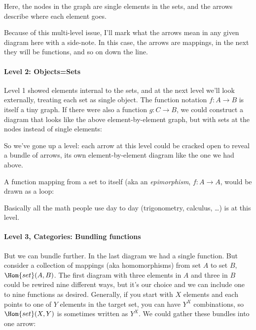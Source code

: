 \documentclass[11pt]{article}
\begin{document}
Here, the nodes in the graph are single elements in the sets, and the arrows describe
where each element goes.

Because of this multi-level issue, I'll mark what the arrows mean in any given diagram
here with a side-note. In this case, the arrows are mappings, in the next they will be
functions, and so on down the line.

\paragraph{Level 2: Objects=Sets}
Level 1 showed elements internal to the sets, and at the next level we'll look externally,
treating each set as single object.
The function notation $f:A\to B$ is itself a tiny graph. If there were also a function
$g:C\to B$, we could construct a diagram that looks like the above element-by-element
graph, but with sets at the nodes instead of single elements:

So we've gone up a level: each arrow at this level could be cracked open to reveal
a bundle of arrows, its own element-by-element diagram like the one we had above.

A function mapping from a set to itself (aka an {\em epimorphism}, $f:A\to A$, would be drawn as a loop:


Basically all the math people use day to day (trigonometry, calculus, \dots) is at this level.

\paragraph{Level 3, Categories: Bundling functions} \label{homsetsec}
But we can bundle further. In the last
diagram we had a single function. But consider a collection of mappings (aka homomorphisms)
from set $A$ to set $B$, $\Hom{set}(A, B)$.
The first diagram with three elements in $A$ and
three in $B$ could be rewired nine different ways, but it's our choice and we can include
one to nine functions as desired. Generally, if you start with $X$ elements and each
points to one of $Y$ elements in the target set, you can have $Y^X$ combinations, so 
$\Hom{set}(X, Y)$ is sometimes written as $Y^X$.  We could gather these bundles into one
arrow:
\end{document}
